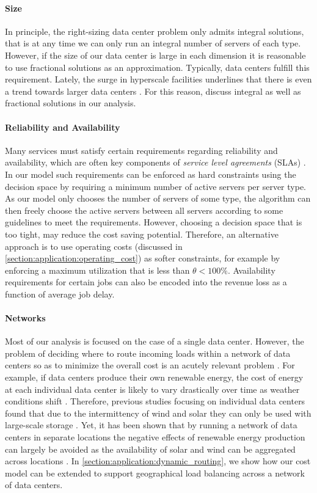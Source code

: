 \paragraph{Size} In principle, the right-sizing data center problem only admits integral solutions, that is at any time we can only run an integral number of servers of each type. However, if the size of our data center is large in each dimension it is reasonable to use fractional solutions as an approximation. Typically, data centers fulfill this requirement. Lately, the surge in hyperscale facilities underlines that there is even a trend towards larger data centers \cite{Jones2018}. For this reason, discuss integral as well as fractional solutions in our analysis.

\paragraph{Reliability and Availability} Many services must satisfy certain requirements regarding reliability and availability, which are often key components of \textit{service level agreements} (SLAs) \cite{Lin2011}. In our model such requirements can be enforced as hard constraints using the decision space by requiring a minimum number of active servers per server type. As our model only chooses the number of servers of some type, the algorithm can then freely choose the active servers between all servers according to some guidelines to meet the requirements. However, choosing a decision space that is too tight, may reduce the cost saving potential. Therefore, an alternative approach is to use operating costs (discussed in \autoref{section:application:operating_cost}) as softer constraints, for example by enforcing a maximum utilization that is less than $\theta < 100\%$. Availability requirements for certain jobs can also be encoded into the revenue loss as a function of average job delay.

\paragraph{Networks} Most of our analysis is focused on the case of a single data center. However, the problem of deciding where to route incoming loads within a network of data centers so as to minimize the overall cost is an acutely relevant problem \cite{Miller2021}. For example, if data centers produce their own renewable energy, the cost of energy at each individual data center is likely to vary drastically over time as weather conditions shift \cite{Lin2012}. Therefore, previous studies focusing on individual data centers found that due to the intermittency of wind and solar they can only be used with large-scale storage \cite{Gmach2010, Gmach2010_2}. Yet, it has been shown that by running a network of data centers in separate locations the negative effects of renewable energy production can largely be avoided as the availability of solar and wind can be aggregated across locations \cite{Lin2012}. In \autoref{section:application:dynamic_routing}, we show how our cost model can be extended to support geographical load balancing across a network of data centers.

